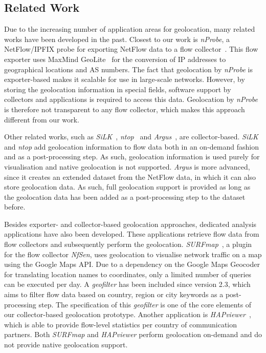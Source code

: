 \subsection{Related Work} \label{subsec:geo-related_work}

Due to the increasing number of application areas for geolocation, many related works have been developed in the past. Closest to our work is \textit{nProbe}, a NetFlow/IPFIX probe for exporting NetFlow data to a flow collector~\cite{--nProbe}. This flow exporter uses MaxMind GeoLite~\cite{MaxMind--GeoLite} for the conversion of IP addresses to geographical locations and AS numbers. The fact that geolocation by \textit{nProbe} is exporter-based makes it scalable for use in large-scale networks. However, by storing the geolocation information in special fields, software support by collectors and applications is required to access this data. Geolocation by \textit{nProbe} is therefore not transparent to any flow collector, which makes this approach different from our work.

Other related works, such as \textit{SiLK}~\cite{CERTNSAT--SiLK}, \textit{ntop}~\cite{--ntop} and \textit{Argus}~\cite{QoSient--ARGUS}, are collector-based. \textit{SiLK} and \textit{ntop} add geolocation information to flow data both in an on-demand fashion and as a post-processing step. As such, geolocation information is used purely for visualisation and native geolocation is not supported. \textit{Argus} is more advanced, since it creates an extended dataset from the NetFlow data, in which it can also store geolocation data. As such, full geolocation support is provided as long as the geolocation data has been added as a post-processing step to the dataset before.

Besides exporter- and collector-based geolocation approaches, dedicated analysis applications have also been developed. These applications retrieve flow data from flow collectors and subsequently perform the geolocation. \textit{SURFmap}~\cite{Hofstede--SURFmap, Hofstede-2009-SURFmap}, a plugin for the flow collector \textit{NfSen}, uses geolocation to visualise network traffic on a map using the Google Maps API. Due to a dependency on the Google Maps Geocoder for translating location names to coordinates, only a limited number of queries can be executed per day. A \textit{geofilter} has been included since version 2.3, which aims to filter flow data based on country, region or city keywords as a post-processing step. The specification of this \textit{geofilter} is one of the core elements of our collector-based geolocation prototype. Another application is \textit{HAPviewer}~\cite{Blatter-2011-Extending}, which is able to provide flow-level statistics per country of communication partners. Both \textit{SURFmap} and \textit{HAPviewer} perform geolocation on-demand and do not provide native geolocation support.

